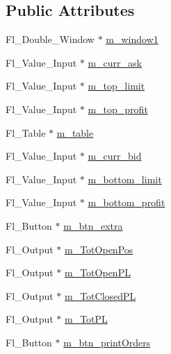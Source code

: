 \subsection*{Public Attributes}
\begin{DoxyCompactItemize}
\item 
Fl\+\_\+\+Double\+\_\+\+Window $\ast$ \hyperlink{class_fluid_interface_a460e32e78feb976474ee0735d0e9fb1c}{m\+\_\+window1}
\item 
Fl\+\_\+\+Value\+\_\+\+Input $\ast$ \hyperlink{class_fluid_interface_ad3602a1cc7b792c75382ea9499ab8dd7}{m\+\_\+curr\+\_\+ask}
\item 
Fl\+\_\+\+Value\+\_\+\+Input $\ast$ \hyperlink{class_fluid_interface_a81b5e83db29bcbfee9e6affed03befbf}{m\+\_\+top\+\_\+limit}
\item 
Fl\+\_\+\+Value\+\_\+\+Input $\ast$ \hyperlink{class_fluid_interface_abea73a05d352082acbecb7e16210708c}{m\+\_\+top\+\_\+profit}
\item 
Fl\+\_\+\+Table $\ast$ \hyperlink{class_fluid_interface_a18542e676efe12b02f8f942a9cec8a62}{m\+\_\+table}
\item 
Fl\+\_\+\+Value\+\_\+\+Input $\ast$ \hyperlink{class_fluid_interface_a510a2ac2cf61761833226823f434a72c}{m\+\_\+curr\+\_\+bid}
\item 
Fl\+\_\+\+Value\+\_\+\+Input $\ast$ \hyperlink{class_fluid_interface_a934958466791ab5e58dc419e83e841e9}{m\+\_\+bottom\+\_\+limit}
\item 
Fl\+\_\+\+Value\+\_\+\+Input $\ast$ \hyperlink{class_fluid_interface_ac19438e0f4c4e8578dc19924baa22757}{m\+\_\+bottom\+\_\+profit}
\item 
Fl\+\_\+\+Button $\ast$ \hyperlink{class_fluid_interface_aa022e70f1c8931e1e900dd02fcc0edb8}{m\+\_\+btn\+\_\+extra}
\item 
Fl\+\_\+\+Output $\ast$ \hyperlink{class_fluid_interface_a7527438818bbe46c24eaa4bf2937edd7}{m\+\_\+\+Tot\+Open\+Pos}
\item 
Fl\+\_\+\+Output $\ast$ \hyperlink{class_fluid_interface_aca2934bd9b472aa0abd681b401d619fa}{m\+\_\+\+Tot\+Open\+PL}
\item 
Fl\+\_\+\+Output $\ast$ \hyperlink{class_fluid_interface_ac0b9cbb054516b180ea22b1df083aaf6}{m\+\_\+\+Tot\+Closed\+PL}
\item 
Fl\+\_\+\+Output $\ast$ \hyperlink{class_fluid_interface_acb76315615db2a907ba49a8c0a8f24aa}{m\+\_\+\+Tot\+PL}
\item 
Fl\+\_\+\+Button $\ast$ \hyperlink{class_fluid_interface_aaaf08b63cd10cc8d3b247e4d24da6e5a}{m\+\_\+btn\+\_\+print\+Orders}

\end{DoxyCompactItemize}

